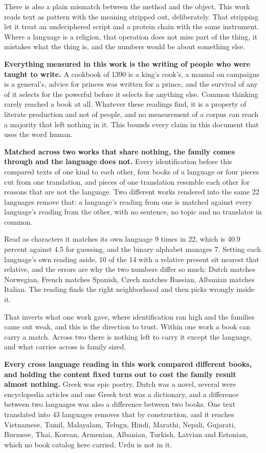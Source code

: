 There is also a plain mismatch between the method and the object. This work reads text as pattern with the meaning stripped out, deliberately. That stripping let it treat an undeciphered script and a protein chain with the same instrument. Where a language is a religion, that operation does not miss part of the thing, it mistakes what the thing is, and the numbers would be about something else.

\textbf{Everything measured in this work is the writing of people who were taught to write.} A cookbook of 1390 is a king's cook's, a manual on campaigns is a general's, advice for princes was written for a prince, and the survival of any of it selects for the powerful before it selects for anything else. Common thinking rarely reached a book at all. Whatever these readings find, it is a property of literate production and not of people, and no measurement of a corpus can reach a majority that left nothing in it. This bounds every claim in this document that uses the word human.

\textbf{Matched across two works that share nothing, the family comes through and the language does not.} Every identification before this compared texts of one kind to each other, four books of a language or four pieces cut from one translation, and pieces of one translation resemble each other for reasons that are not the language. Two different works rendered into the same 22 languages remove that: a language's reading from one is matched against every language's reading from the other, with no sentence, no topic and no translator in common.

Read as characters it matches its own language 9 times in 22, which is 40.9 percent against 4.5 for guessing, and the binary alphabet manages 7. Setting each language's own reading aside, 10 of the 14 with a relative present sit nearest that relative, and the errors are why the two numbers differ so much: Dutch matches Norwegian, French matches Spanish, Czech matches Russian, Albanian matches Italian. The reading finds the right neighborhood and then picks wrongly inside it.

That inverts what one work gave, where identification ran high and the families came out weak, and this is the direction to trust. Within one work a book can carry a match. Across two there is nothing left to carry it except the language, and what carries across is family sized.

\textbf{Every cross language reading in this work compared different books, and holding the content fixed turns out to cost the family result almost nothing.} Greek was epic poetry, Dutch was a novel, several were encyclopedia articles and one Greek text was a dictionary, and a difference between two languages was also a difference between two books. One text translated into 43 languages removes that by construction, and it reaches Vietnamese, Tamil, Malayalam, Telugu, Hindi, Marathi, Nepali, Gujarati, Burmese, Thai, Korean, Armenian, Albanian, Turkish, Latvian and Estonian, which no book catalog here carried. Urdu is not in it.

